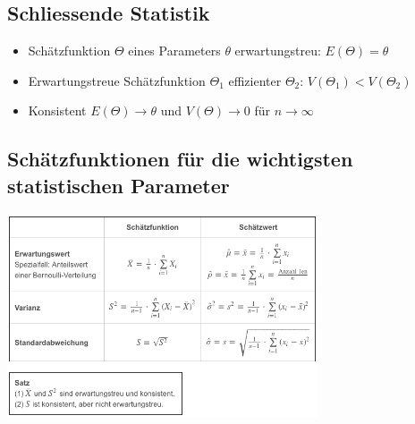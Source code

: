 \documentclass[8pt,a4paper]{scrartcl}
\begin{document}
\begin{multicols*}{3}
			\section{Schliessende Statistik}
			
			 	\begin{itemize}\itemsep0pt				
					\item Schätzfunktion $\Theta$ eines Parameters $\theta$ erwartungstreu: $E(\Theta)=\theta $
					\item Erwartungstreue Schätzfunktion $\Theta_{1}$ effizienter $\Theta_{2}$: $ V(\Theta_{1})<V(\Theta_{2})$
					\item Konsistent $E(\Theta)\rightarrow\theta$ und $V(\Theta)\rightarrow 0$ für $n\rightarrow \infty$
				\end{itemize}	
				\subsection{Schätzfunktionen für die wichtigsten statistischen Parameter}
					\includegraphics[height=6cm]{img/schaetz1.png} 



\end{multicols*}
\end{document}
